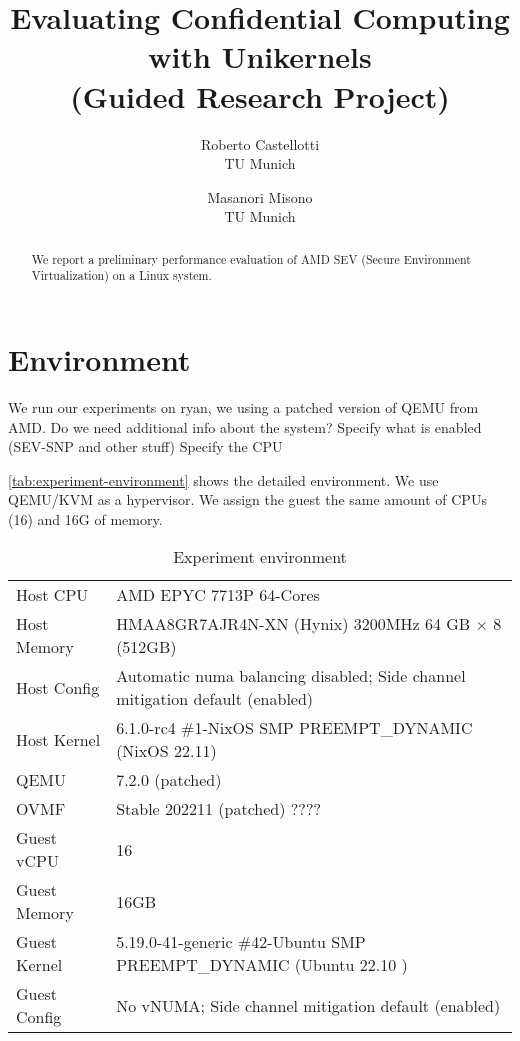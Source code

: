 \documentclass[letterpaper,twocolumn,10pt]{article}
\newcommand{\titlename}{
Evaluating Confidential Computing with Unikernels \\ (Guided Research Project)
}
\begin{document}
\date{}
\title{\Large \bf \titlename}

\author{
{\rm Roberto Castellotti}\\TU Munich
\and
{\rm Masanori Misono}\\TU Munich
}

\maketitle

\begin{abstract}
We report a preliminary performance evaluation of AMD SEV (Secure Environment Virtualization) on a Linux system.
\end{abstract}

\section{Environment}

We run our experiments on ryan, we using a patched version of QEMU from AMD.
Do we need additional info about the system?
Specify what is enabled (SEV-SNP and other stuff)
Specify the CPU

\autoref{tab:experiment-environment} shows the detailed environment.
We use QEMU/KVM as a hypervisor.
We assign the guest the same amount of CPUs (16) and 16G of memory.

\begin{table*}[t]
\centering
\caption{Experiment environment}
\label{tab:experiment-environment}
\begin{tabular}{l|l}
\toprule
    Host CPU      & AMD EPYC 7713P 64-Cores  \\
    Host Memory   & HMAA8GR7AJR4N-XN (Hynix) 3200MHz 64 GB $\times$ 8 (512GB) \\
    Host Config   & Automatic numa balancing disabled; Side channel mitigation default (enabled) \\
    Host Kernel   & 6.1.0-rc4 \#1-NixOS SMP PREEMPT\_DYNAMIC (NixOS 22.11) \\
    QEMU          & 7.2.0 (patched) \\
\midrule
    OVMF          & Stable 202211 (patched) ????  \\
    Guest vCPU    & 16 \\
    Guest Memory  & 16GB  \\
    Guest Kernel  & 5.19.0-41-generic \#42-Ubuntu SMP PREEMPT\_DYNAMIC (Ubuntu 22.10
    ) \\
    Guest Config  & No vNUMA; Side channel mitigation default (enabled) \\
\bottomrule
\end{tabular}
\end{table*}
\end{document}
